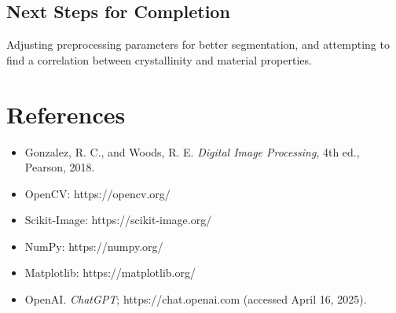 \documentclass[12pt]{article}
\begin{document}
\subsection{Next Steps for Completion}
Adjusting preprocessing parameters for better segmentation, and attempting to find a correlation between crystallinity and
 material properties.

\section{References}
\begin{itemize}
    \item Gonzalez, R. C., and Woods, R. E. \textit{Digital Image Processing}, 4th ed., Pearson, 2018.
    \item OpenCV: https://opencv.org/
    \item Scikit-Image: https://scikit-image.org/
    \item NumPy: https://numpy.org/
    \item Matplotlib: https://matplotlib.org/
    \item OpenAI. \textit{ChatGPT}; https://chat.openai.com (accessed April 16, 2025).
\end{itemize}
\end{document}
